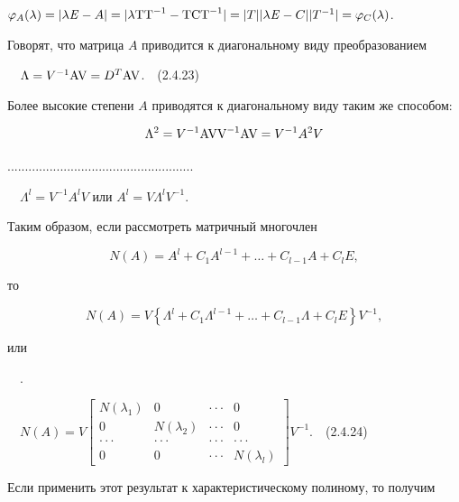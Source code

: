 		
		$\varphi _A(\lambda )=|\mathit{\lambda E}-A|=|\lambda \normalsubformula{\text{TT}}^{-1}-\normalsubformula{\text{TCT}}^{-1}|=|T||\mathit{\lambda E}-C||T^{-1}|=\varphi _C(\lambda )$.



		Говорят, что матрица  $A$ приводится к диагональному виду преобразованием



		\ \  $\Lambda =V^{-1}\normalsubformula{\text{AV}}=D^T\normalsubformula{\text{AV}}$.\ \ (2.4.23)



		Более высокие степени  $A$ приводятся к диагональному виду таким же способом:


\begin{equation*}
\Lambda ^2=V^{-1}\normalsubformula{\text{AVV}}^{-1}\normalsubformula{\text{AV}}=V^{-1}A^2V
\end{equation*}

		  .....................................................



		\ \  $\Lambda ^l=V^{-1}A^lV$ или  $A^l=\mathit{V\Lambda }^lV^{-1}$.



		Таким образом, если рассмотреть матричный многочлен 


\begin{equation*}
N(A)=A^l+C_1A^{l-1}+\ldots +C_{l-1}A+C_lE,
\end{equation*}

		то 


\begin{equation*}
N(A)=V\left\{\Lambda ^l+C_1\Lambda ^{l-1}+\ldots +C_{l-1}\Lambda +C_lE\right\}V^{-1},
\end{equation*}

		или



		\ \ .



		\ \  $N(A)=V\left[\begin{matrix}N(\lambda _1)&0&\cdot \cdot \cdot &0\\0&N(\lambda _2)&\cdot \cdot \cdot &0\\\cdot \cdot \cdot &\cdot
		\cdot \cdot &\cdot \cdot \cdot &\cdot \cdot \cdot \\0&0&\cdot \cdot \cdot
		&N(\lambda _l)\end{matrix}\right]V^{-1}$.\ \ (2.4.24)



		Если применить этот результат к характеристическому полиному, то получим



